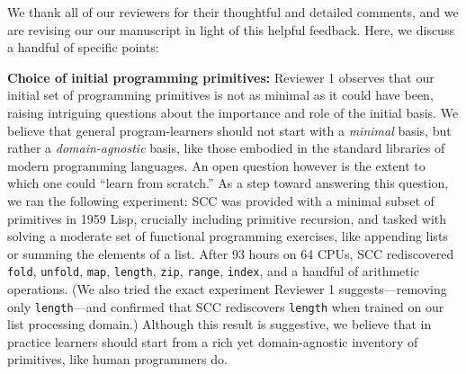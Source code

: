 \documentclass{article}
\begin{document}
We thank all of our reviewers for their thoughtful and detailed comments, and we are revising our our manuscript in light of this helpful feedback.
Here, we discuss a handful of specific points:

\textbf{Choice of initial programming primitives:} Reviewer 1 observes that our initial set of programming primitives is
not as minimal as it could have been,
raising intriguing questions
about the importance and role of the initial basis.
We believe that general program-learners should not start with a \emph{minimal} basis,
but rather a \emph{domain-agnostic}
basis,
like those embodied in the standard libraries of modern programming languages.
An open question however is the extent to which one could ``learn from scratch.''
As a step toward answering this question,
we ran the following experiment:
SCC was provided with a minimal subset of primitives in 1959 Lisp, crucially including primitive recursion,
and tasked with solving a moderate set of functional programming exercises, like appending lists or summing the elements of a list.
After 93 hours on 64 CPUs,
SCC rediscovered \texttt{fold}, \texttt{unfold}, \texttt{map},
\texttt{length}, \texttt{zip}, \texttt{range}, \texttt{index},
and a handful of arithmetic operations.
(We also tried the exact experiment Reviewer 1 suggests---removing only \texttt{length}---and confirmed that SCC rediscovers \texttt{length} when trained on our list processing domain.)
Although this result is suggestive,
we believe that in practice learners should start from a rich yet domain-agnostic
inventory of primitives, like human programmers do.


\end{document}
